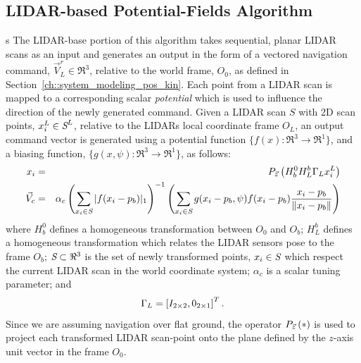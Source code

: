 	\subsection{LIDAR-based Potential-Fields Algorithm}s
		The LIDAR-base portion of this algorithm takes sequential, planar LIDAR scans as an input and generates an output in the form of a vectored navigation command, $\vec{V}_{L}^{r}\in \Re^{3}$, relative to the world frame, $O_{0}$, as defined in Section~\ref{ch::system_modeling_pos_kin}. Each point from a LIDAR scan is mapped to a corresponding scalar \emph{potential} which is used to influence the direction of the newly generated command. Given a LIDAR scan $S$ with 2D scan points, $x_{i}^{L}\in\emph{S}^{L}$, relative to the LIDARs local coordinate frame $O_{L}$, an output command vector is generated using a potential function $\{ f(x) : \Re^{3}\rightarrow \Re^{1} \}$, and a biasing function, $\{ g(x,\psi) : \Re^{3}\rightarrow \Re^{1} \}$, as follows:
%
	\begin{eqnarray}
	x_{i}  &=& P_{ \vec{z} } \left( H_{b}^{0} H_{L}^{b} \Gamma_{L} x_{i}^{L} \right) \nonumber \\
	\vec{V}_{c} &=& \alpha_{c} \left(\sum_{x_{i}\in \emph{S}} |f( x_{i}-p_{b})|_{1}\right)^{-1}  \left( \sum_{x_{i} \in \emph{S}} g( x_{i}-p_{b},\psi)  f( x_{i}-p_{b} ) \frac{x_{i}-p_{b}}{\left\lVert x_{i}-p_{b}\right\rVert} \right)
	\end{eqnarray}
	where $H_{b}^{0}$ defines a homogeneous transformation between $O_{0}$ and $O_{b}$; $H_{L}^{b}$ defines a homogeneous transformation which relates the LIDAR sensors pose to the frame $O_{b}$; $\emph{S}\subset \Re^{3}$ is the set of newly transformed points, $x_{i} \in \emph{S}$ which respect the current LIDAR scan in the world coordinate system; $\alpha_{c}$ is a scalar tuning parameter; and 
	\begin{equation*}
		\Gamma_{L} = \left[ I_{2\times2}, 0_{2\times1} \right]^{T}.
	\end{equation*}
Since we are assuming navigation over flat ground, the operator $P_{ \vec{z} }\left(*\right)$ is used to project each transformed LIDAR scan-point onto the plane defined by the $z$-axis unit vector in the frame $O_{0}$.

